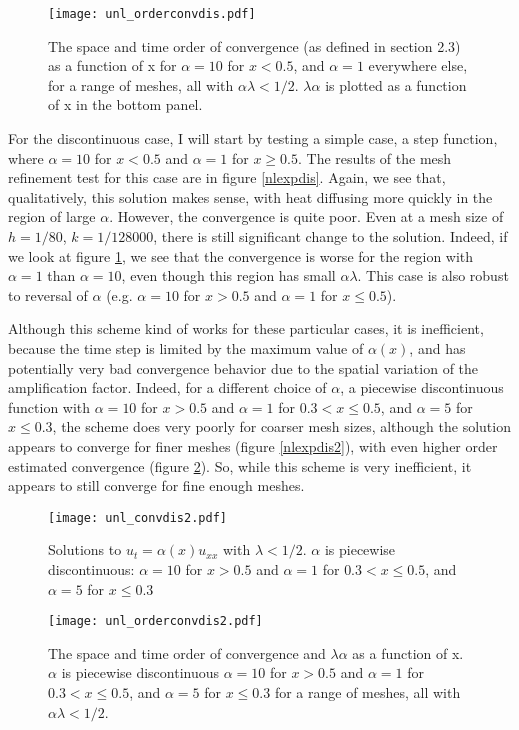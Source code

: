 \documentclass[11pt]{amsart}
\begin{document}
\begin{figure}
\begin{center} 
\texttt{[image: unl\_orderconvdis.pdf]}
\caption{The space and time order of convergence (as defined in section 2.3) as a function of x for   $\alpha= 10$ for $x<0.5$, and $\alpha = 1$ everywhere else, for a range of meshes, all with $\alpha\lambda < 1/2$. $\lambda\alpha$ is plotted as a function of x in the bottom panel. }
\label{nlorderdis} 
\end{center}
\end{figure}

For the discontinuous case, I will start by testing a simple case, a step function, where $\alpha = 10$ for $x <0.5$ and $\alpha = 1$ for $x \ge 0.5$. The results of the mesh refinement test for this case are in figure \ref{nlexpdis}. Again, we see that, qualitatively, this solution makes sense, with heat diffusing more quickly in the region of large $\alpha$. However, the convergence is quite poor. Even at a mesh size of $h=1/80$, $k=1/128000$, there is still significant change to the solution. Indeed, if we look at  figure \ref{nlorderdis}, we see that the convergence is worse for the region with $\alpha = 1$ than $\alpha = 10$, even though this region has small $\alpha\lambda$. This case is also robust to reversal of $\alpha$ (e.g. $\alpha = 10$ for $x >0.5$ and $\alpha = 1$ for $x \le 0.5$). 

Although this scheme kind of works for these particular cases, it is inefficient, because the time step is limited by the maximum value of $\alpha(x)$, and has potentially very bad convergence behavior due to the spatial variation of the amplification factor.  Indeed, for a different choice of $\alpha$, a piecewise discontinuous function with $\alpha = 10$ for $x >0.5$ and $\alpha = 1$ for $0.3 < x \le 0.5$, and $\alpha = 5$ for $x \le 0.3$, the scheme does very poorly for coarser mesh sizes, although the solution appears to converge for finer meshes (figure \ref{nlexpdis2}), with even higher order estimated convergence (figure \ref{nlorderdis2}). So, while this scheme is very inefficient, it appears to still converge for fine enough meshes. 

\begin{figure}
\begin{center} 
\texttt{[image: unl\_convdis2.pdf]}
\caption{Solutions to $u_t =\alpha(x) u_{xx}$ with $\lambda < 1/2$. $\alpha$ is piecewise discontinuous:  $\alpha = 10$ for $x >0.5$ and $\alpha = 1$ for $0.3 < x \le 0.5$, and $\alpha = 5$ for $x \le 0.3$  }
\label{nlexpdis2} 
\texttt{[image: unl\_orderconvdis2.pdf]}
\caption{The space and time order of convergence and  $\lambda\alpha$  as a function of x. $\alpha$ is piecewise discontinuous  $\alpha = 10$ for $x >0.5$ and $\alpha = 1$ for $0.3 < x \le 0.5$, and $\alpha = 5$ for $x \le 0.3$ for a range of meshes, all with $\alpha\lambda < 1/2$.}
\label{nlorderdis2} 
\end{center}
\end{figure}
\end{document}
